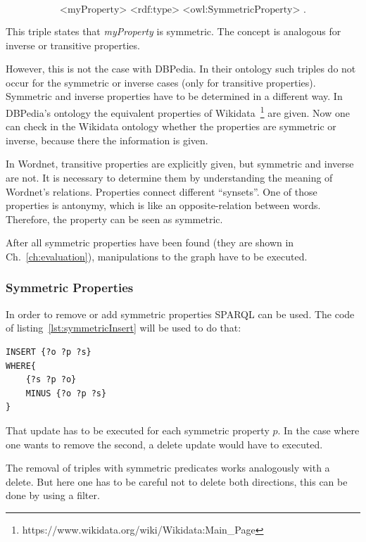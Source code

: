 \[
\text{<myProperty> <rdf:type> <owl:SymmetricProperty> .} 
\]

This triple states that \textit{myProperty} is symmetric. The concept is analogous for inverse or transitive properties. 

However, this is not the case with DBPedia. In their ontology such triples do not occur for the symmetric or inverse cases (only for transitive properties). Symmetric and inverse properties have to be determined in a different way. In DBPedia's ontology the equivalent properties of Wikidata~\footnote{https://www.wikidata.org/wiki/Wikidata:Main\_Page} are given. Now one can check in the Wikidata ontology whether the properties are symmetric or inverse, because there the information is given.

In Wordnet, transitive properties are explicitly given, but symmetric and inverse are not. It is necessary to determine them by understanding the meaning of Wordnet's relations. Properties connect different \enquote{synsets}. One of those properties is antonymy, which is like an opposite-relation between words. Therefore, the property can be seen as symmetric.


After all symmetric properties have been found (they are shown in Ch.~\ref{ch:evaluation}), manipulations to the graph have to be executed.

\subsubsection{Symmetric Properties}

In order to remove or add symmetric properties SPARQL can be used. The code of listing~\ref{lst:symmetricInsert} will be used to do that:

\begin{lstlisting}[captionpos=b, caption=SPARQL update for adding triples with the symmetric property p., label=lst:symmetricInsert,
basicstyle=\ttfamily,frame=single]
INSERT {?o ?p ?s}
WHERE{
	{?s ?p ?o}
	MINUS {?o ?p ?s}
}
\end{lstlisting}

That update has to be executed for each symmetric property $p$. In the case where one wants to remove the second, a delete update would have to executed.

The removal of triples with symmetric predicates works analogously with a delete. But here one has to be careful not to delete both directions, this can be done by using a filter.

